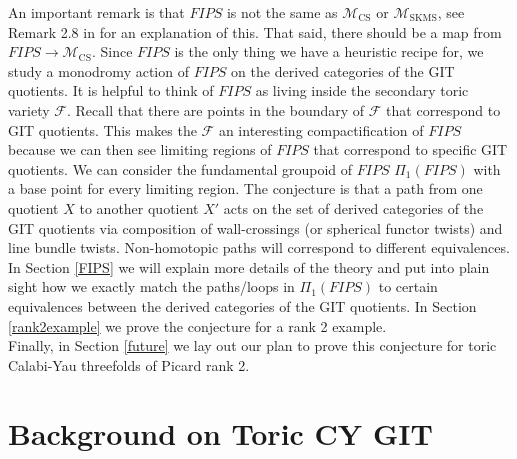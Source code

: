 \documentclass[oneside,reqno]{amsart}
\theoremstyle{definition}
\theoremstyle{definition}
\theoremstyle{definition}
\theoremstyle{definition}
\newcommand{\Fs}{\mathcal{F}}
\begin{document}
\newline 
An important remark is that $FIPS$ is not the same as $\mathcal{M}_{\text{CS}}$ or $\mathcal{M}_{\text{SKMS}}$, see Remark 2.8 in \cite{edwill} for an explanation of this. That said, there should be a map from $FIPS \to \mathcal{M}_{\text{CS}}$. Since $FIPS$ is the only thing we have a heuristic recipe for, we study a monodromy action of $FIPS$ on the derived categories of the GIT quotients. It is helpful to think of $FIPS$ as living inside the secondary toric variety $\Fs$. Recall that there are points in the boundary of $\Fs$ that correspond to GIT quotients. This makes the $\Fs$ an interesting compactification of $FIPS$ because we can then see limiting regions of $FIPS$ that correspond to specific GIT quotients. We can consider the fundamental groupoid of $FIPS$ $\Pi_1(FIPS)$ with a base point for every limiting region. The conjecture is that a path from one quotient $X$ to another quotient $X'$ acts on the set of derived categories of the GIT quotients via composition of wall-crossings (or spherical functor twists) and line bundle twists. Non-homotopic paths will correspond to different equivalences. \\
\newline
In Section \ref{FIPS} we will explain more details of the theory and put into plain sight how we exactly match the paths/loops in $\Pi_1(FIPS)$ to certain equivalences between the derived categories of the GIT quotients. In Section \ref{rank2example} we prove the conjecture for a rank 2 example.  \\
\newline
Finally, in Section \ref{future} we lay out our plan to prove this conjecture for toric Calabi-Yau threefolds of Picard rank 2.

\section{Background on Toric CY GIT}
\label{background}
\end{document}
